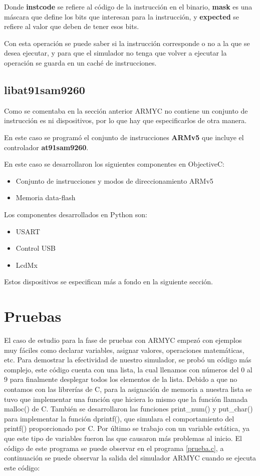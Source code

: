 Donde \textbf{instcode} se refiere al código de la instrucción en el binario, \textbf{mask} es una máscara que define los bits que interesan para la instrucción, y \textbf{expected} se refiere al valor que deben de tener esos bits.

Con esta operación se puede saber si la instrucción corresponde o no a la que se desea ejecutar, y para que el simulador no tenga que volver a ejecutar la operación se guarda en un caché de instrucciones.

\subsection{libat91sam9260}

Como se comentaba en la sección anterior ARMYC no contiene un conjunto de instrucción es ni dispositivos, por lo que hay que especificarlos de otra manera. 

En este caso se programó el conjunto de instrucciones \textbf{ARMv5} que incluye el controlador \textbf{at91sam9260}.

En este caso se desarrollaron los siguientes componentes en ObjectiveC:

\begin{itemize}
\item Conjunto de instrucciones y modos de direccionamiento ARMv5
\item Memoria data-flash
\end{itemize}

Los componentes desarrollados en Python son:

\begin{itemize}
\item USART
\item Control USB
\item LcdMx
\end{itemize}

Estos dispositivos se especifican más a fondo en la siguiente sección.

\section{Pruebas}

El caso de estudio para la fase de pruebas con ARMYC empezó con ejemplos muy fáciles como declarar variables, asignar valores, operaciones matemáticas, etc. Para demostrar la efectividad de nuestro simulador, se probó un código más complejo, este código cuenta con una lista, la cual llenamos con números del 0 al 9 para finalmente desplegar todos los elementos de la lista. Debido a que no contamos con las librerías de C, para la asignación de memoria a nuestra lista se tuvo que implementar una función que hiciera lo mismo que la función llamada malloc() de C. También se desarrollaron las funciones print\_num() y put\_char() para implementar la función dprintf(), que simulara el comportamiento del printf() proporcionado por C. Por último se trabajo con un variable estática, ya que este tipo de variables fueron las que causaron más problemas al inicio. El código de este programa se puede observar en el programa \ref{prueba.c}, a continuación se puede observar la salida del simulador ARMYC cuando se ejecuta este código:

